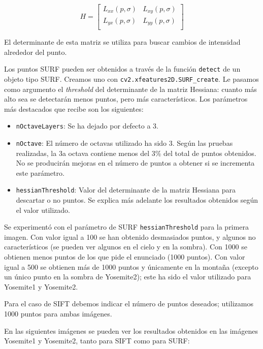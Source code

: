 \documentclass[12pt,spanish]{article} %
\begin{document}
\[
H
=
\begin{bmatrix}
    L_{xx}(p, \sigma) & L_{xy}(p, \sigma) \\
    L_{yx}(p, \sigma) & L_{yy}(p, \sigma) \\
\end{bmatrix}
\]

El determinante de esta matriz se utiliza para buscar cambios de intensidad alrededor del punto.

Los puntos SURF pueden ser obtenidos a través de la función \texttt{detect} de un objeto tipo SURF. Creamos uno con \texttt{cv2.xfeatures2D.SURF\_create}. Le pasamos como argumento el \textit{threshold} del determinante de la matriz Hessiana: cuanto más alto sea se detectarán menos puntos, pero más característicos. Los parámetros más destacados que recibe son los siguientes:

\begin{itemize}
\item \texttt{nOctaveLayers}: Se ha dejado por defecto a 3.
\item \texttt{nOctave}: El número de octavas utilizado ha sido 3. Según las pruebas realizadas, la 3a octava contiene menos del 3\% del total de puntos obtenidos. No se producirán mejoras en el número de puntos a obtener si se incrementa este parámetro.
\item \texttt{hessianThreshold}: Valor del determinante de la matriz Hessiana para descartar o no puntos. Se explica más adelante los resultados obtenidos según el valor utilizado.

\end{itemize}

Se experimentó con el parámetro de SURF \texttt{hessianThreshold} para la primera imagen. Con valor igual a 100 se han obtenido desmasiados puntos, y algunos no característicos (se pueden ver algunos en el cielo y en la sombra). Con 1000 se obtienen menos puntos de los que pide el enunciado (1000 puntos). Con valor igual a 500 se obtienen más de 1000 puntos y únicamente en la montaña (excepto un único punto en la sombra de Yosemite2); este ha sido el valor utilizado para Yosemite1 y Yosemite2.

Para el caso de SIFT debemos indicar el número de puntos deseados; utilizamos 1000 puntos para ambas imágenes.

En las siguientes imágenes se pueden ver los resultados obtenidos en las imágenes Yosemite1 y Yosemite2, tanto para SIFT como para SURF:
\end{document}
